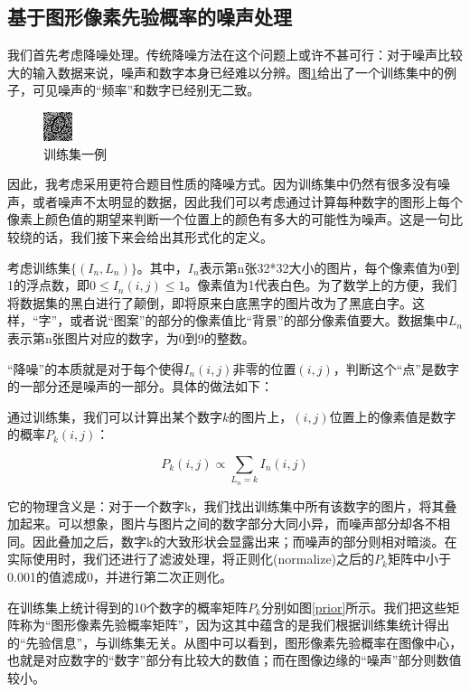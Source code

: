 \documentclass[UTF8]{ctexart}
\begin{document}
\subsection{基于图形像素先验概率的噪声处理}

我们首先考虑降噪处理。传统降噪方法在这个问题上或许不甚可行：对于噪声比较大的输入数据来说，噪声和数字本身已经难以分辨。图\ref{train_set_sample}给出了一个训练集中的例子，可见噪声的“频率”和数字已经别无二致。

\begin{figure}
	\centering
	\includegraphics{train_set_sample}
	\caption{训练集一例}
	\label{train_set_sample}
\end{figure}

因此，我考虑采用更符合题目性质的降噪方式。因为训练集中仍然有很多没有噪声，或者噪声不太明显的数据，因此我们可以考虑通过计算每种数字的图形上每个像素上颜色值的期望来判断一个位置上的颜色有多大的可能性为噪声。这是一句比较绕的话，我们接下来会给出其形式化的定义。

考虑训练集$\{(I_n, L_n)\}$。其中，$I_n$表示第n张32*32大小的图片，每个像素值为0到1的浮点数，即$0 \leq I_n(i, j) \leq 1$。像素值为1代表白色。为了数学上的方便，我们将数据集的黑白进行了颠倒，即将原来白底黑字的图片改为了黑底白字。这样，“字”，或者说“图案”的部分的像素值比“背景”的部分像素值要大。数据集中$L_n$表示第n张图片对应的数字，为0到9的整数。

“降噪”的本质就是对于每个使得$I_n(i, j)$非零的位置$(i, j)$，判断这个“点”是数字的一部分还是噪声的一部分。具体的做法如下：

通过训练集，我们可以计算出某个数字$k$的图片上，$(i, j)$位置上的像素值是数字的概率$P_k(i, j)$：

$$ P_k(i, j) \propto \sum_{L_n = k}{I_n(i, j)} $$

它的物理含义是：对于一个数字k，我们找出训练集中所有该数字的图片，将其叠加起来。可以想象，图片与图片之间的数字部分大同小异，而噪声部分却各不相同。因此叠加之后，数字k的大致形状会显露出来；而噪声的部分则相对暗淡。在实际使用时，我们还进行了滤波处理，将正则化(normalize)之后的$P_k$矩阵中小于0.001的值滤成0，并进行第二次正则化。

在训练集上统计得到的10个数字的概率矩阵$P_k$分别如图\ref{prior}所示。我们把这些矩阵称为“图形像素先验概率矩阵”，因为这其中蕴含的是我们根据训练集统计得出的“先验信息”，与训练集无关。从图中可以看到，图形像素先验概率在图像中心，也就是对应数字的“数字”部分有比较大的数值；而在图像边缘的“噪声”部分则数值较小。
\end{document}
